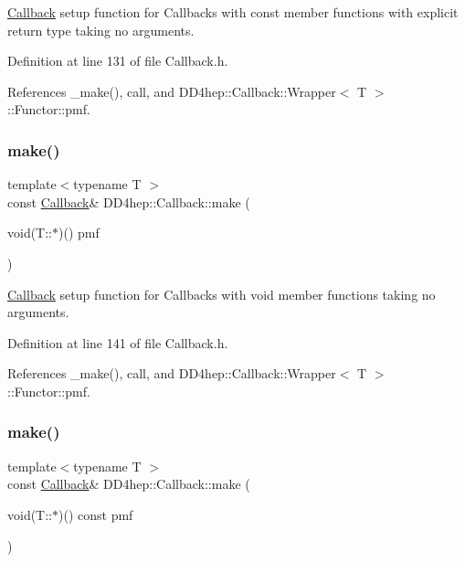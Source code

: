\hyperlink{class_d_d4hep_1_1_callback}{Callback} setup function for Callbacks with const member functions with explicit return type taking no arguments. 



Definition at line 131 of file Callback.\+h.



References \+\_\+make(), call, and D\+D4hep\+::\+Callback\+::\+Wrapper$<$ T $>$\+::\+Functor\+::pmf.

\hypertarget{class_d_d4hep_1_1_callback_a51a6c79e5f292d5aba9c3dcd104d53cf}{}\label{class_d_d4hep_1_1_callback_a51a6c79e5f292d5aba9c3dcd104d53cf} 
\subsubsection{\texorpdfstring{make()}{make()}\hspace{0.1cm}{\footnotesize\ttfamily [3/17]}}
{\footnotesize\ttfamily template$<$typename T $>$ \\
const \hyperlink{class_d_d4hep_1_1_callback}{Callback}\& D\+D4hep\+::\+Callback\+::make (\begin{DoxyParamCaption}\item[{void(T\+::$\ast$)()}]{pmf }\end{DoxyParamCaption})\hspace{0.3cm}{\ttfamily [inline]}}



\hyperlink{class_d_d4hep_1_1_callback}{Callback} setup function for Callbacks with void member functions taking no arguments. 



Definition at line 141 of file Callback.\+h.



References \+\_\+make(), call, and D\+D4hep\+::\+Callback\+::\+Wrapper$<$ T $>$\+::\+Functor\+::pmf.

\hypertarget{class_d_d4hep_1_1_callback_aca07f39912775acf30d57143a5bda47b}{}\label{class_d_d4hep_1_1_callback_aca07f39912775acf30d57143a5bda47b} 
\subsubsection{\texorpdfstring{make()}{make()}\hspace{0.1cm}{\footnotesize\ttfamily [4/17]}}
{\footnotesize\ttfamily template$<$typename T $>$ \\
const \hyperlink{class_d_d4hep_1_1_callback}{Callback}\& D\+D4hep\+::\+Callback\+::make (\begin{DoxyParamCaption}\item[{void(T\+::$\ast$)() const}]{pmf }\end{DoxyParamCaption})\hspace{0.3cm}{\ttfamily [inline]}}



